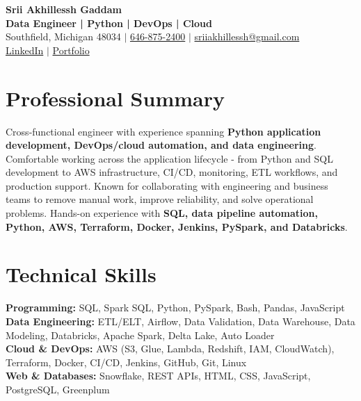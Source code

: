 \documentclass[letterpaper,10pt]{article}
\begin{document}
\fontsize{9.35pt}{10.45pt}\selectfont

\begin{center}
    {\LARGE \textbf{Srii Akhillessh Gaddam}} \\[-1pt]
    \textbf{Data Engineer | Python | DevOps | Cloud} \\[2pt]
    Southfield, Michigan 48034 $|$
    \href{tel:6468752400}{646-875-2400} $|$
    \href{mailto:sriiakhillessh@gmail.com}{sriiakhillessh@gmail.com} \\[1pt]
    \href{https://www.linkedin.com/in/srii-akhiilessh-gaddam-b48668191/}{LinkedIn} $|$
    \href{https://sriiakhillesshg.github.io/portfolio/}{Portfolio}
\end{center}
\vspace{-8pt}

\section{Professional Summary}
\small{Cross-functional engineer with experience spanning \textbf{Python application development, DevOps/cloud automation, and data engineering}. Comfortable working across the application lifecycle - from Python and SQL development to AWS infrastructure, CI/CD, monitoring, ETL workflows, and production support. Known for collaborating with engineering and business teams to remove manual work, improve reliability, and solve operational problems. Hands-on experience with \textbf{SQL, data pipeline automation, Python, AWS, Terraform, Docker, Jenkins, PySpark, and Databricks}.}

\section{Technical Skills}
\small{
\textbf{Programming:} SQL, Spark SQL, Python, PySpark, Bash, Pandas, JavaScript \\
\textbf{Data Engineering:} ETL/ELT, Airflow, Data Validation, Data Warehouse, Data Modeling, Databricks, Apache Spark, Delta Lake, Auto Loader \\
\textbf{Cloud \& DevOps:} AWS (S3, Glue, Lambda, Redshift, IAM, CloudWatch), Terraform, Docker, CI/CD, Jenkins, GitHub, Git, Linux \\
\textbf{Web \& Databases:} Snowflake, REST APIs, HTML, CSS, JavaScript, PostgreSQL, Greenplum
}
\end{document}
